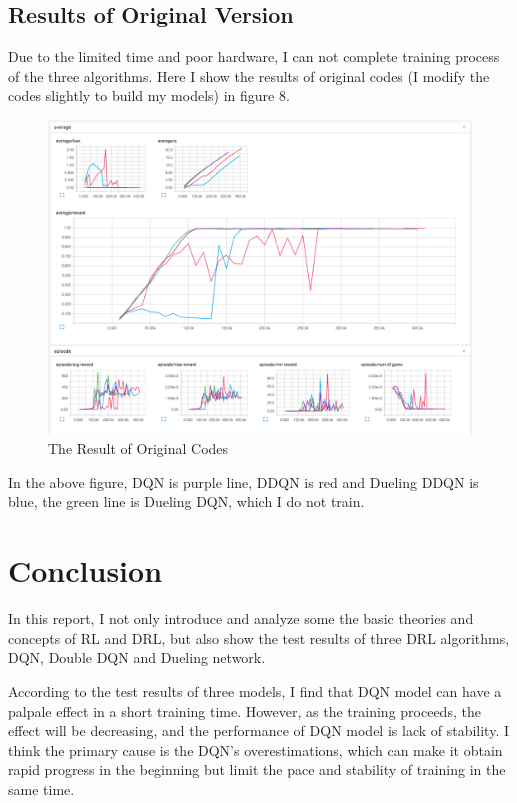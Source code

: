 \documentclass[10pt,twocolumn,letterpaper]{article}
\begin{document}
\subsection{Results of Original Version}
Due to the limited time and poor hardware, I can not complete training process of the three algorithms. Here I show the results of original codes (I modify the codes slightly to build my models) in figure 8.

	\begin{figure}[!htb]
    	\centering
    	\includegraphics[width = \linewidth]{images/real_result}
    	\caption{The Result of Original Codes}
    	\label{fig::Result}
   \end{figure}
   
   In the above figure, DQN is purple line, DDQN is red and Dueling DDQN is blue, the green line is Dueling DQN, which I do not train.

\section{Conclusion}
In this report, I not only introduce and analyze some the basic theories and concepts of RL and DRL, but also show the test results of three DRL algorithms, DQN, Double DQN and Dueling network.

According to the test results of three models, I find that DQN model can have a palpale effect in a short training time. However, as the training proceeds, the effect will be decreasing, and the performance of DQN model is lack of stability. I think the primary cause is the DQN's overestimations, which can make it obtain rapid progress in the beginning but limit the pace and stability of training in the same time. 
\end{document}
